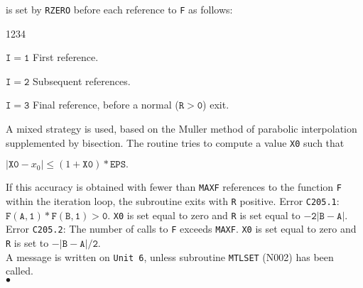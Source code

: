 is set by {\tt RZERO} before each reference to {\tt F} as follows:
\begin{DLtt}{1234}
\item[] $\mathtt{I=1}$ First reference.
\item[] $\mathtt{I=2}$ Subsequent references.
\item[] $\mathtt{I=3}$ Final reference, before a normal
($\mathtt{R>0}$)
exit.
\end{DLtt}
\Method
A mixed strategy is used, based on the Muller method of
parabolic interpolation supplemented by bisection.
\newpage
\Accuracy
The routine tries to compute a value {\tt X0} such that
\begin{center}
$|\mathtt{X0} - x_0| \le (1 + \mathtt{X0}) * \mathtt{EPS}.$
\end{center}
If this accuracy is obtained with fewer than {\tt MAXF} references
to the function {\tt F} within the iteration loop, the subroutine
exits with {\tt R} positive.
\Errorh
Error {\tt C205.1}: $\mathtt{F(A,1)*F(B,1) > 0}$.
{\tt X0} is set equal to zero and {\tt R}
is set equal to $\mathtt{-2|B-A|}$. \\
Error {\tt C205.2}: The number of calls to {\tt F} exceeds {\tt MAXF}.
{\tt X0} is set equal to zero and {\tt R} is set to
$\mathtt{-|B-A|/2}$. \\
A message is written on {\tt Unit 6}, unless subroutine
{\tt MTLSET} (N002) has been called.
\\ $\bullet$
